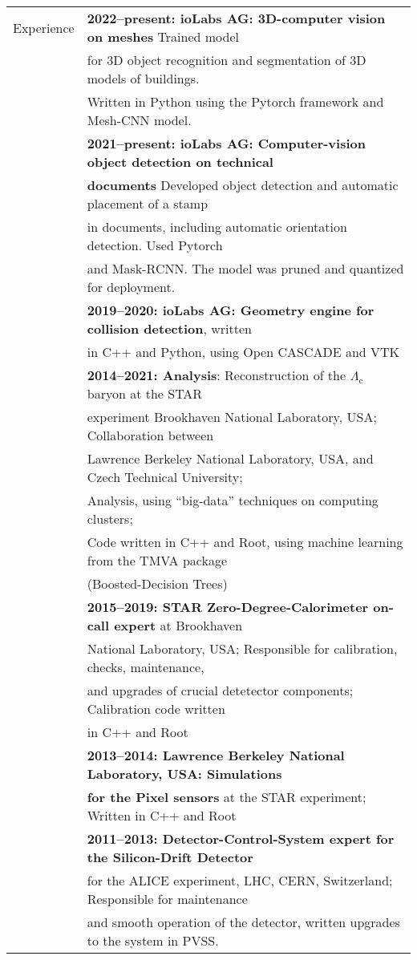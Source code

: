 \documentclass[a4paper,11pt,oneside]{article}
\begin{document}
\begin{tabular}{@{} l l}
  \Large{Experience} & \textbf{2022--present: ioLabs AG: 3D-computer vision on meshes} Trained model \\
     & for 3D object recognition and segmentation of 3D models of buildings. \\
     & Written in Python using the Pytorch framework and Mesh-CNN model.\\[.2cm]
     & \textbf{2021--present: ioLabs AG: Computer-vision object detection on technical} \\ 
     & \textbf{documents} Developed object detection and automatic placement of a stamp \\
     & in documents, including automatic orientation detection. Used Pytorch  \\
     & and Mask-RCNN\@. The model was pruned and quantized for deployment.\\[.2cm]
     & \textbf{2019--2020: ioLabs AG: Geometry engine for collision detection}, written\\
     &  in C++ and Python, using Open CASCADE and VTK\\[.2cm]
     & \textbf{2014--2021: Analysis}: Reconstruction of the $\Lambda_\mathrm{c}$ baryon  at the STAR \\
     & experiment Brookhaven National Laboratory, USA; Collaboration between \\
     &  Lawrence Berkeley National Laboratory, USA, and Czech Technical University;\\
     & Analysis, using ``big-data'' techniques on computing clusters; \\
     & Code written in C++ and Root, using machine learning from the TMVA package \\
     & (Boosted-Decision Trees)\\[.2cm]
     & \textbf{2015--2019: STAR Zero-Degree-Calorimeter on-call expert} at Brookhaven \\ 
     & National Laboratory, USA\@; Responsible for calibration, checks, maintenance, \\
     & and upgrades of crucial detetector components; Calibration code written \\
     & in C++ and Root \\[.2cm]
     & \textbf{2013--2014: Lawrence Berkeley National Laboratory, USA\@: Simulations } \\ 
     & \textbf{for the Pixel sensors} at the STAR experiment; Written in C++ and Root\\[.2cm]
     & \textbf{2011--2013: Detector-Control-System expert for the Silicon-Drift Detector} \\
     & for the ALICE experiment, LHC, CERN, Switzerland; Responsible for maintenance \\
     & and smooth operation of the detector, written upgrades to the system in PVSS. \\
    

\end{tabular}
\end{document}
